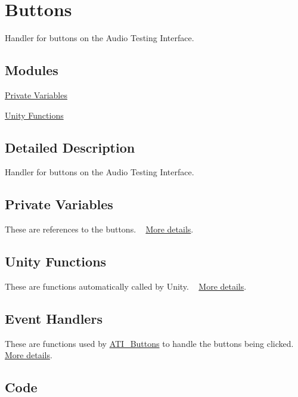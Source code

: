 \hypertarget{group___doc_a_t_i_buttons}{}\section{Buttons}
\label{group___doc_a_t_i_buttons}


Handler for buttons on the Audio Testing Interface.  


\subsection*{Modules}
\begin{DoxyCompactItemize}
\item 
\hyperlink{group___a_t_i_buttons_priv_var}{Private Variables}
\item 
\hyperlink{group___a_t_i_buttons_unity}{Unity Functions}
\end{DoxyCompactItemize}


\subsection{Detailed Description}
Handler for buttons on the Audio Testing Interface. 

\hypertarget{group___doc_a_t_i_buttons_DocATIButtonsPrivVar}{}\subsection{Private Variables}\label{group___doc_a_t_i_buttons_DocATIButtonsPrivVar}
These are references to the buttons. ~\newline
 \hyperlink{group___a_t_i_buttons_priv_var}{More details}.\hypertarget{group___doc_a_t_i_buttons_DocATIButtonsUnity}{}\subsection{Unity Functions}\label{group___doc_a_t_i_buttons_DocATIButtonsUnity}
These are functions automatically called by Unity. ~\newline
 \hyperlink{group___a_t_i_buttons_unity}{More details}.\hypertarget{group___doc_a_t_i_buttons_DocATIButtonsHandlers}{}\subsection{Event Handlers}\label{group___doc_a_t_i_buttons_DocATIButtonsHandlers}
These are functions used by \hyperlink{class_a_t_i___buttons}{A\+T\+I\+\_\+\+Buttons} to handle the buttons being clicked. ~\newline
 \hyperlink{group___a_t_i_buttons_handlers}{More details}.\hypertarget{group___doc_a_t_i_buttons_DocATIButtonsCode}{}\subsection{Code}\label{group___doc_a_t_i_buttons_DocATIButtonsCode}

